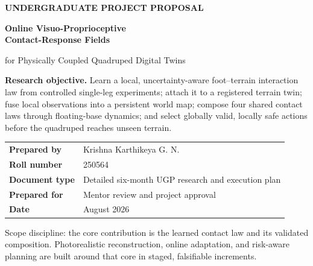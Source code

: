 \documentclass[11pt,a4paper]{article}
\begin{document}
\hypersetup{pageanchor=false}

\begin{titlepage}
\thispagestyle{empty}

\vspace*{10mm}
{\Large\color{cyan}\bfseries UNDERGRADUATE PROJECT PROPOSAL\par}
\vspace{10mm}
{\fontsize{27}{32}\selectfont\color{white}\bfseries
Online Visuo-Proprioceptive\\[2mm]
Contact-Response Fields\par}
\vspace{4mm}
{\Large\color{white}
for Physically Coupled Quadruped Digital Twins\par}

\vspace{28mm}
\begin{tcolorbox}[colback=paper,colframe=blue,width=\textwidth,boxrule=0.9pt,arc=3mm]
\textbf{Research objective.} Learn a local, uncertainty-aware foot--terrain interaction law from controlled single-leg experiments; attach it to a registered terrain twin; fuse local observations into a persistent world map; compose four shared contact laws through floating-base dynamics; and select globally valid, locally safe actions before the quadruped reaches unseen terrain.
\end{tcolorbox}

\vfill
\begin{tabularx}{\textwidth}{@{}lY@{}}
\textbf{Prepared by} & Krishna Karthikeya G. N.\\
\textbf{Roll number} & 250564\\
\textbf{Document type} & Detailed six-month UGP research and execution plan\\
\textbf{Prepared for} & Mentor review and project approval\\
\textbf{Date} & August 2026\\
\end{tabularx}

\vspace{14mm}
{\small\color{muted}
Scope discipline: the core contribution is the learned contact law and its validated composition. Photorealistic reconstruction, online adaptation, and risk-aware planning are built around that core in staged, falsifiable increments.\par}
\end{titlepage}
\end{document}
